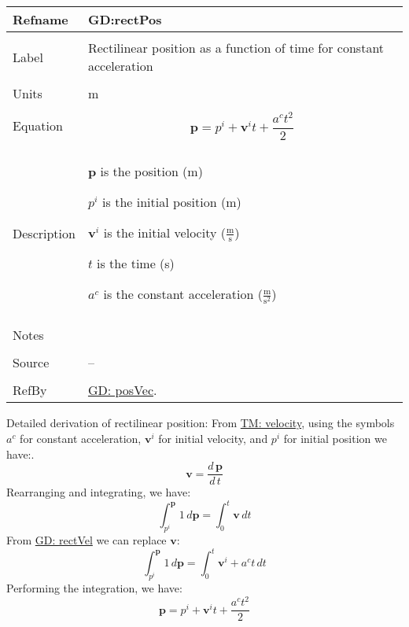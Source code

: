 \documentclass[12pt]{article}
\begin{document}
\noindent \begin{minipage}{\textwidth}
\begin{tabular}{p{} p{}}
\toprule \textbf{Refname} & \textbf{GD:rectPos}
\label{GD:rectPos}
\\ \midrule \\
Label & Rectilinear position as a function of time for constant acceleration
\\ \midrule \\
Units & m
\\ \midrule \\
Equation & \begin{displaymath}
           \mathbf{p}={p^{i}}+{\mathbf{v}^{i}} t+\frac{{a^{c}} t^{2}}{2}
           \end{displaymath}
\\ \midrule \\
Description & \begin{symbDescription}
              \item{$\mathbf{p}$ is the position (m)}
              \item{${p^{i}}$ is the initial position (m)}
              \item{${\mathbf{v}^{i}}$ is the initial velocity ($\frac{\text{m}}{\text{s}}$)}
              \item{$t$ is the time (s)}
              \item{${a^{c}}$ is the constant acceleration ($\frac{\text{m}}{\text{s}^{2}}$)}
              \end{symbDescription}
\\ \midrule \\
Notes & 
\\ \midrule \\
Source & --
\\ \midrule \\
RefBy & \hyperref[GD:posVec]{GD: posVec}.
\\ \bottomrule \end{tabular}
\end{minipage}
Detailed derivation of rectilinear position:
From \hyperref[TM:velocity]{TM: velocity}, using the symbols ${a^{c}}$ for constant acceleration, ${\mathbf{v}^{i}}$ for initial velocity, and ${p^{i}}$ for initial position we have:.
\begin{displaymath}
\mathbf{v}=\frac{d\,\mathbf{p}}{d\,t}
\end{displaymath}
Rearranging and integrating, we have:
\begin{displaymath}
\int_{{p^{i}}}^{\mathbf{p}}{1}\,d\mathbf{p}=\int_{0}^{t}{\mathbf{v}}\,dt
\end{displaymath}
From \hyperref[GD:rectVel]{GD: rectVel} we can replace $\mathbf{v}$:
\begin{displaymath}
\int_{{p^{i}}}^{\mathbf{p}}{1}\,d\mathbf{p}=\int_{0}^{t}{{\mathbf{v}^{i}}+{a^{c}} t}\,dt
\end{displaymath}
Performing the integration, we have:
\begin{displaymath}
\mathbf{p}={p^{i}}+{\mathbf{v}^{i}} t+\frac{{a^{c}} t^{2}}{2}
\end{displaymath}
\par~
\end{document}
